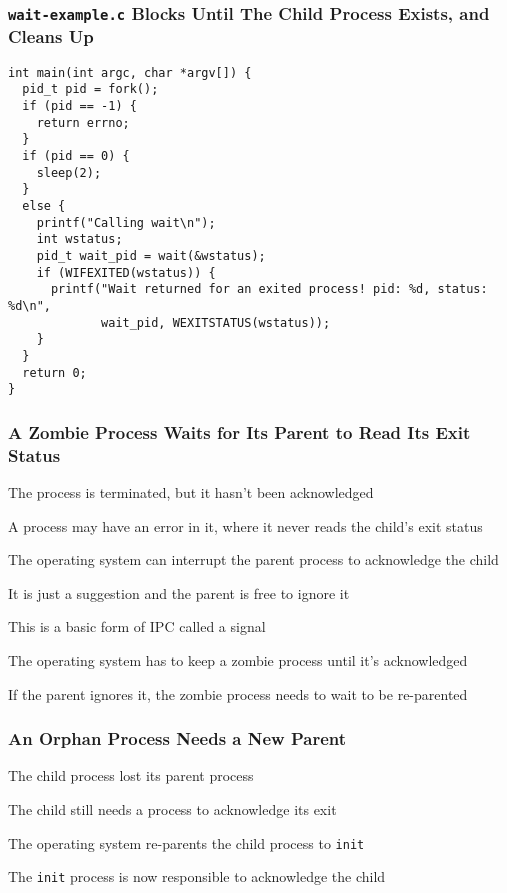   \begin{frame}[fragile]
    \frametitle{\texttt{wait-example.c} Blocks Until The Child Process Exists, and Cleans Up}

    \begin{lstlisting}
int main(int argc, char *argv[]) {
  pid_t pid = fork();
  if (pid == -1) {
    return errno;
  }
  if (pid == 0) {
    sleep(2);
  }
  else {
    printf("Calling wait\n");
    int wstatus;
    pid_t wait_pid = wait(&wstatus);
    if (WIFEXITED(wstatus)) {
      printf("Wait returned for an exited process! pid: %d, status: %d\n",
             wait_pid, WEXITSTATUS(wstatus));
    }
  }
  return 0;
}
    \end{lstlisting}
  \end{frame}

  \begin{frame}
    \frametitle{A Zombie Process Waits for Its Parent to Read Its Exit Status}

    The process is terminated, but it hasn't been acknowledged

    \vspace{2em}

    A process may have an error in it, where it never reads the child's exit status

    \vspace{2em}

    The operating system can interrupt the parent process to acknowledge the child

    \hspace{2em} It is just a suggestion and the parent is free to ignore it

    \hspace{4em} This is a basic form of IPC called a signal

    \vspace{4em}

    The operating system has to keep a zombie process until it's acknowledged

    \hspace{2em} If the parent ignores it, the zombie process needs to wait to
    be re-parented
  \end{frame}

  \begin{frame}
    \frametitle{An Orphan Process Needs a New Parent}

    The child process lost its parent process

    \hspace{2em} The child still needs a process to acknowledge its exit

    \vspace{2em}

    The operating system re-parents the child process to \texttt{init}

    \hspace{2em} The \texttt{init} process is now responsible to acknowledge the
                 child
  \end{frame}

